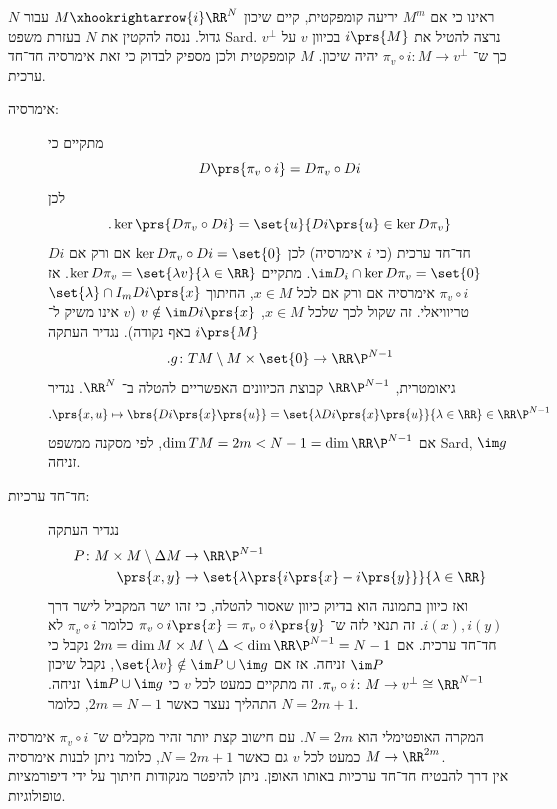 \documentclass[a4paper,10pt,twoside,openany]{book}
\begin{document}
ראינו כי אם
$M^m$
יריעה קומפקטית, קיים שיכון
$M \xhookrightarrow{i} \RR^N$
עבור
$N$
גדול. ננסה להקטין את
$N$
בעזרת משפט
\textenglish{Sard}.
נרצה להטיל את
$i\prs{M}$
בכיוון
$v$
על
$v^{\perp}$
כך ש־%
$\pi_v \circ i \colon M \to v^{\perp}$
יהיה שיכון.
$M$
קומפקטית ולכן מספיק לבדוק כי זאת אימרסיה חד־חד ערכית.
\begin{description}
\item[אימרסיה:]
מתקיים כי
\[D\prs{\pi_v \circ i} = D\pi_v \circ D i\]
לכן
\[\text{.}\ker\prs{D\pi_v \circ D i} = \set{u}{Di\prs{u} \in \ker D\pi_v}\]
$Di$
חד־חד ערכית (כי
$i$
אימרסיה) לכן
$\ker D\pi_v \circ Di = \set{0}$
אם ורק אם
$\im D_i \cap \ker D\pi_v = \set{0}$.
מתקיים
$\ker D\pi_v = \set{\lambda v}{\lambda \in \RR}$.
אז
$\pi_v \circ i$
אימרסיה אם ורק אם
לכל
$x \in M$,
החיתוך
$\set{\lambda} \cap I_m Di\prs{x}$
טריוויאלי. זה שקול לכך שלכל
$x \in M$,
$v \notin \im Di\prs{x}$
($v$
אינו משיק ל־%
$i\prs{M}$
באף נקודה).
נגדיר העתקה
\[\text{.} g \colon TM \setminus M \times \set{0} \to \RR\P^{N-1}\]
גיאומטרית,
$\RR\P^{N-1}$
קבוצת הכיוונים האפשריים להטלה ב־%
$\RR^N$.
נגדיר
\[\text{.}\prs{x,u} \mapsto \brs{D i\prs{x}\prs{u}} = \set{\lambda Di\prs{x}\prs{u}}{\lambda \in \RR} \in \RR\P^{N-1}\]
אם
$\dim TM = 2m < N-1 = \dim \RR\P^{N-1}$,
לפי מסקנה ממשפט
\textenglish{Sard},
$\im g$
זניחה.
\item[חד־חד ערכיות:]
נגדיר העתקה
\begin{align*}
P \colon M\times M \setminus \Delta M &\to \RR\P^{N-1} \\
\prs{x,y} &\to \set{\lambda\prs{i\prs{x} - i\prs{y}}}{\lambda \in \RR}
\end{align*}
ואז כיוון בתמונה הוא בדיוק כיוון שאסור להטלה, כי זהו ישר המקביל לישר דרך
$i(x), i(y)$.
זה תנאי לזה ש־%
$\pi_v \circ i \prs{x} = \pi_v \circ i\prs{y}$
כלומר
$\pi_v \circ i$
לא חד־חד ערכית.
אם
$2m = \dim M\times M \setminus \Delta < \dim \RR\P^{N-1} = N-1$
נקבל כי
$\im P$
זניחה.
אז אם
$\set{\lambda v} \notin \im P \cup \im g$,
נקבל שיכון
$\pi_v \circ i \colon M \to v^{\perp} \cong \RR^{N-1}$.
זה מתקיים כמעט לכל
$v$
כי
$\im P \cup \im g$
זניחה.
התהליך נעצר כאשר
$2m = N-1$,
כלומר
$N = 2m + 1$.
\end{description}

\begin{remark}
המקרה האופטימלי הוא
$N = 2m$.
עם חישוב קצת יותר זהיר מקבלים ש־%
$\pi_v \circ i$
אימרסיה כמעט לכל
$v$
גם כאשר
$N = 2m + 1$,
כלומר ניתן לבנות אימרסיה
$M \to \RR^{2m}$.\\
אין דרך להבטיח חד־חד ערכיות באותו האופן.
ניתן להיפטר מנקודות חיתוך על ידי דיפורמציות טופולוגיות.
\end{remark}
\end{document}
